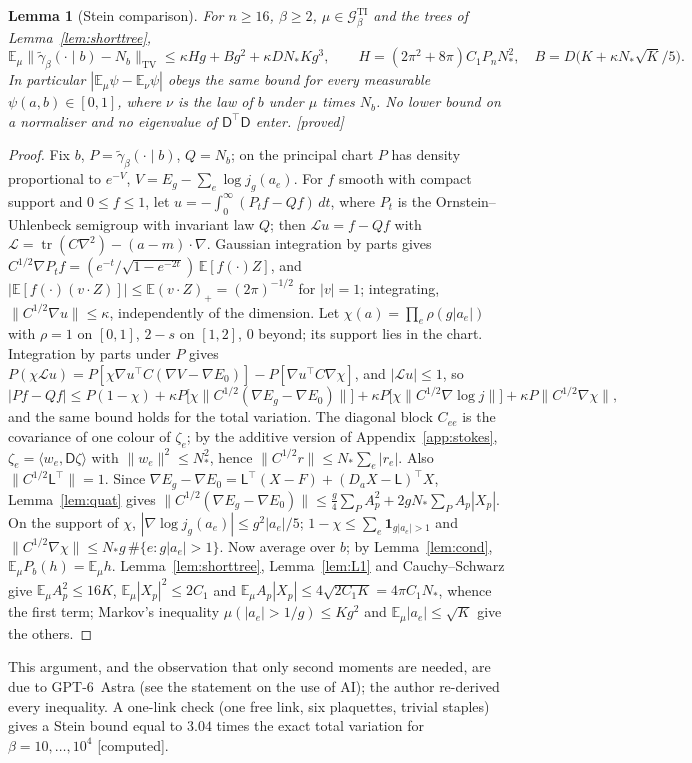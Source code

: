 \documentclass[11pt,a4paper]{article}
\theoremstyle{plain}
\newtheorem{lemma}[theorem]{Lemma}
\theoremstyle{definition}
\theoremstyle{remark}
\numberwithin{equation}{section}
\newcommand{\E}{\mathbb{E}}
\newcommand{\tr}{\operatorname{tr}}
\newcommand{\st}[1]{\textsf{[#1]}}
\newcommand{\cG}{\mathcal{G}}
\begin{document}
\begin{lemma}[Stein comparison]\label{lem:stein}
For $n\ge16$, $\beta\ge2$, $\mu\in\cG^{\mathrm{TI}}_\beta$ and the trees of Lemma~\ref{lem:shorttree},
\[
\E_\mu\bigl\|\tilde\gamma_\beta(\cdot\mid b)-N_b\bigr\|_{\mathrm{TV}}\le\kappa Hg+Bg^2+\kappa DN_*Kg^3,\qquad
H=(2\pi^2+8\pi)C_1P_nN_*^2,\quad B=D\bigl(K+\kappa N_*\sqrt K/5\bigr).
\]
In particular $|\E_\mu\psi-\E_\nu\psi|$ obeys the same bound for every measurable $\psi(a,b)\in[0,1]$, where $\nu$ is the law of $b$ under
$\mu$ times $N_b$. No lower bound on a normaliser and no eigenvalue of $\mathsf D^\top\mathsf D$ enter. \st{proved}
\end{lemma}
\begin{proof}
Fix $b$, $P=\tilde\gamma_\beta(\cdot\mid b)$, $Q=N_b$; on the principal chart $P$ has density proportional to $e^{-V}$, $V=E_g-\sum_e\log j_g(a_e)$.
For $f$ smooth with compact support and $0\le f\le1$, let $u=-\int_0^\infty(P_tf-Qf)\,dt$, where $P_t$ is the Ornstein--Uhlenbeck
semigroup with invariant law $Q$; then $\mathcal Lu=f-Qf$ with $\mathcal L=\tr(C\nabla^2)-(a-m)\cdot\nabla$. Gaussian integration by parts gives
$C^{1/2}\nabla P_tf=(e^{-t}/\sqrt{1-e^{-2t}})\,\E[f(\cdot)Z]$, and $|\E[f(\cdot)(v\cdot Z)]|\le\E(v\cdot Z)_+=(2\pi)^{-1/2}$ for $|v|=1$; integrating,
$\|C^{1/2}\nabla u\|\le\kappa$, independently of the dimension.
Let $\chi(a)=\prod_e\rho(g|a_e|)$ with $\rho=1$ on $[0,1]$, $2-s$ on $[1,2]$, $0$ beyond; its support lies in the chart. Integration by parts under $P$
gives $P(\chi\mathcal Lu)=P[\chi\nabla u^\top C(\nabla V-\nabla E_0)]-P[\nabla u^\top C\nabla\chi]$, and $|\mathcal Lu|\le1$, so
\[
|Pf-Qf|\le P(1-\chi)+\kappa P\bigl[\chi\|C^{1/2}(\nabla E_g-\nabla E_0)\|\bigr]+\kappa P\bigl[\chi\|C^{1/2}\nabla\log j\|\bigr]+\kappa P\|C^{1/2}\nabla\chi\|,
\]
and the same bound holds for the total variation. The diagonal block $C_{ee}$ is the covariance of one colour of $\zeta_e$; by the additive
version of Appendix~\ref{app:stokes}, $\zeta_e=\langle w_e,\mathsf D\zeta\rangle$ with $\|w_e\|^2\le N_*^2$, hence $\|C^{1/2}r\|\le N_*\sum_e|r_e|$.
Also $\|C^{1/2}\mathsf L^\top\|=1$. Since $\nabla E_g-\nabla E_0=\mathsf L^\top(X-F)+(D_aX-\mathsf L)^\top X$, Lemma~\ref{lem:quat} gives
$\|C^{1/2}(\nabla E_g-\nabla E_0)\|\le\frac g4\sum_PA_p^2+2gN_*\sum_PA_p|X_p|$. On the support of $\chi$, $|\nabla\log j_g(a_e)|\le g^2|a_e|/5$;
$1-\chi\le\sum_e\mathbf1_{g|a_e|>1}$ and $\|C^{1/2}\nabla\chi\|\le N_*g\,\#\{e:g|a_e|>1\}$.
Now average over $b$; by Lemma~\ref{lem:cond}, $\E_\mu P_b(h)=\E_\mu h$. Lemma~\ref{lem:shorttree}, Lemma~\ref{lem:L1} and Cauchy--Schwarz give
$\E_\mu A_p^2\le16K$, $\E_\mu|X_p|^2\le2C_1$ and $\E_\mu A_p|X_p|\le4\sqrt{2C_1K}=4\pi C_1N_*$, whence the first term; Markov's inequality
$\mu(|a_e|>1/g)\le Kg^2$ and $\E_\mu|a_e|\le\sqrt K$ give the others.
\end{proof}
This argument, and the observation that only second moments are needed, are due to GPT-6~Astra (see the statement on the use of AI);
the author re-derived every inequality. A one-link check (one free link, six plaquettes, trivial staples) gives a Stein bound equal to
$3.04$ times the exact total variation for $\beta=10,\dots,10^4$ \st{computed}.
\end{document}
